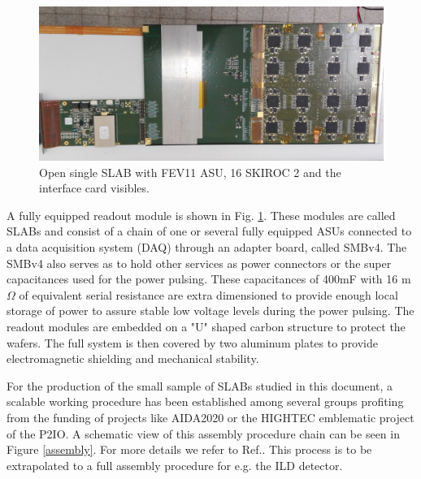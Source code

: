 \documentclass[a4paper,11pt]{article}
\begin{document}
\begin{figure}[!ht]
  \centering
    \includegraphics[width=6in]{../figs/short_slab_bga.jpg} 
  \caption{Open single SLAB with FEV11 ASU, 16 SKIROC 2 and the interface card visibles. }
\label{ASU2}
\end{figure}

A fully equipped readout module is shown in Fig. \ref{ASU2}. These modules are called
SLABs and consist of a chain of one or several fully equipped ASUs
connected to a data acquisition system (DAQ) through an adapter board, called SMBv4.
The SMBv4 also serves as to hold other
services as power connectors or the super capacitances used for the power pulsing. 
These capacitances of 400mF with 16 m$\Omega$ of equivalent serial resistance
are extra dimensioned to provide enough local storage 
of power to assure stable low voltage levels during the power pulsing. %
The readout modules are embedded on a "U" shaped carbon structure to protect the wafers.
The full system is then covered by two aluminum plates
to provide electromagnetic shielding and mechanical stability.

For the production of the small sample of SLABs studied in this document,
a scalable working procedure has been established among several groups \cite{Boudry:2318814}
profiting from the funding of projects like AIDA2020 or the HIGHTEC emblematic project
of the P2IO. A schematic view of this assembly procedure chain can be seen in
Figure \ref{assembly}. For more details we refer to Ref.\cite{Boudry:2318814}.
This process is to be extrapolated to a full assembly procedure for
e.g. the ILD detector.
\end{document}
